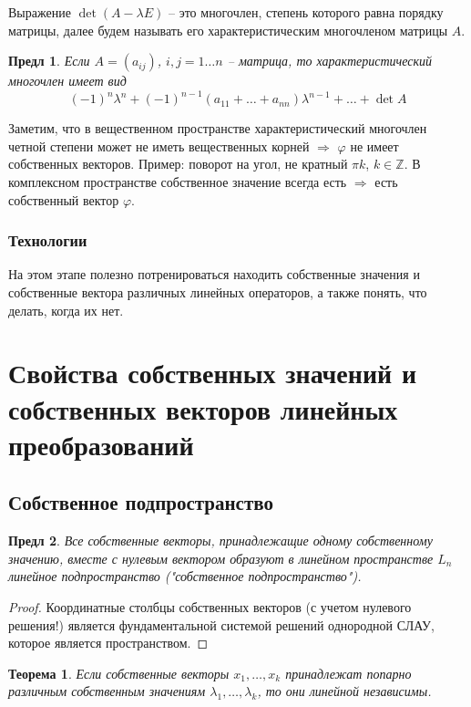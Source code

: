 \documentclass[a4paper,12pt]{article}
\newtheorem{theorem}{Теорема}[section]
\newtheorem{propos}{Предл}[section]
\begin{document}
Выражение $\det (A - \lambda E)$ -- это многочлен, степень которого равна порядку матрицы, далее будем называть его характеристическим многочленом матрицы $A$.

\begin{propos}
	Если $A = (a_{ij})$, $i,j = 1 \ldots n$ -- матрица, то характеристический многочлен имеет вид
	\[
		(-1)^n \lambda^n + (-1)^{n-1} (a_{11} + \ldots +  a_{nn}) \lambda^{n-1} + \ldots + \det A
	\]
\end{propos}

Заметим, что в вещественном пространстве характеристический многочлен четной степени может не иметь вещественных корней $\Rightarrow$ $\varphi$ не имеет собственных векторов. Пример: поворот на угол, не кратный $\pi k$, $k \in \mathbb{Z}$. В комплексном пространстве собственное значение всегда есть $\Rightarrow$ есть собственный вектор $\varphi$.

\subsubsection{Технологии}
На этом этапе полезно потренироваться находить собственные значения и собственные вектора различных линейных операторов, а также понять, что делать, когда их нет.

\section{Свойства собственных значений и собственных векторов линейных преобразований}
\subsection{Собственное подпространство}

\begin{propos}
	Все собственные векторы, принадлежащие одному собственному значению, вместе с нулевым вектором образуют в линейном пространстве $L_n$ линейное подпространство ("собственное подпространство").
\end{propos}
\begin{proof}
	Координатные столбцы собственных векторов (с учетом нулевого решения!) является фундаментальной системой решений однородной СЛАУ, которое является пространством.
\end{proof}

\begin{theorem}
	Если собственные векторы $x_1, \ldots, x_k$ принадлежат попарно различным собственным значениям $\lambda_1, \ldots, \lambda_k$, то они линейной независимы.
\end{theorem}
\end{document}
